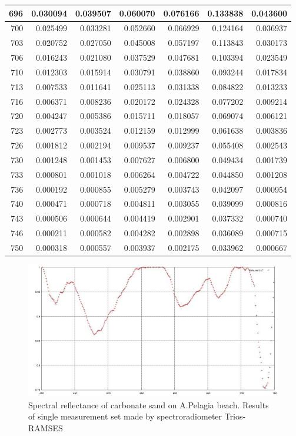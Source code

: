 \documentclass[10pt, a4paper]{article}
\begin{document}
\begin{appendices}
\begin{longtable}{|r|r|r|r|r|r|r|}
696 & 0.030094 & 0.039507 & 0.060070 & 0.076166 & 0.133838 & 0.043600 \\ \hline
700 & 0.025499 & 0.033281 & 0.052660 & 0.066929 & 0.124164 & 0.036937 \\ \hline
703 & 0.020752 & 0.027050 & 0.045008 & 0.057197 & 0.113843 & 0.030173 \\ \hline
706 & 0.016243 & 0.021080 & 0.037529 & 0.047681 & 0.103394 & 0.023549 \\ \hline
710 & 0.012303 & 0.015914 & 0.030791 & 0.038860 & 0.093244 & 0.017834 \\ \hline
713 & 0.007533 & 0.011641 & 0.025113 & 0.031338 & 0.084822 & 0.013233 \\ \hline
716 & 0.006371 & 0.008236 & 0.020172 & 0.024328 & 0.077202 & 0.009214 \\ \hline
720 & 0.004247 & 0.005386 & 0.015711 & 0.018057 & 0.069074 & 0.006121 \\ \hline
723 & 0.002773 & 0.003524 & 0.012159 & 0.012999 & 0.061638 & 0.003836 \\ \hline
726 & 0.001812 & 0.002194 & 0.009537 & 0.009237 & 0.055408 & 0.002543 \\ \hline
730 & 0.001248 & 0.001453 & 0.007627 & 0.006800 & 0.049434 & 0.001739 \\ \hline
733 & 0.000801 & 0.001018 & 0.006264 & 0.004722 & 0.044850 & 0.001208 \\ \hline
736 & 0.000192 & 0.000855 & 0.005279 & 0.003743 & 0.042097 & 0.000954 \\ \hline
740 & 0.000471 & 0.000718 & 0.004811 & 0.003055 & 0.039099 & 0.000816 \\ \hline
743 & 0.000506 & 0.000644 & 0.004419 & 0.002901 & 0.037332 & 0.000740 \\ \hline
746 & 0.000211 & 0.000582 & 0.004282 & 0.002898 & 0.036089 & 0.000715 \\ \hline
750 & 0.000318 & 0.000557 & 0.003937 & 0.002175 & 0.033962 & 0.000667 \\ \hline
\end{longtable}

\begin{figure}[H]
\centering
\includegraphics[scale=0.35]{Fig-26.jpg}
\caption{Spectral reflectance of carbonate sand on A.Pelagia beach. Results of single measurement set made by spectroradiometer Trios-RAMSES}
\label{fig:58}
\end{figure}
\pagebreak
\newpage


\end{appendices}
\end{document}
